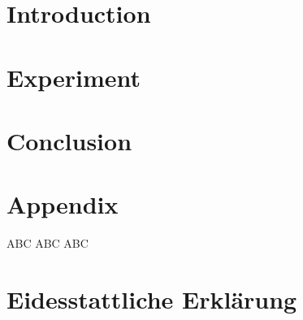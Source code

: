\documentclass[a4paper,12pt,oneside]{article}
\begin{document}
    \newpage
    
    
    \begin{abstract}
    
    \end{abstract}
    
    \newpage
    
    \tableofcontents
    
    \newpage
    \pagestyle{fancy} %
    
    
    \listoffigures
    \newpage
    
    \listoftables
    \newpage
    
  
    
    \section{Introduction}\label{introduction}  
     
    \newpage

    \section{Experiment}
    
    \newpage
    
    \section{Conclusion}\label{conclusion}  
     
    
    
    \newpage
    \setcounter{section}{0} %
    \renewcommand*\thesection{\Alph{section}} %
    \section{Appendix}\label{appendix}
    
        ABC
    \newpage
        ABC
    \newpage
        ABC
    \newpage
    
    
    \pagestyle{empty}
    \section{Eidesstattliche Erklärung}
    
\end{document}
